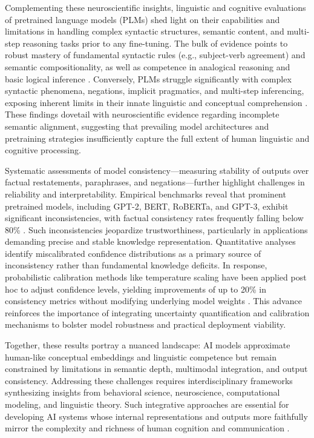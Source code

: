 \documentclass[sigconf]{acmart}
\begin{document}
Complementing these neuroscientific insights, linguistic and cognitive evaluations of pretrained language models (PLMs) shed light on their capabilities and limitations in handling complex syntactic structures, semantic content, and multi-step reasoning tasks prior to any fine-tuning. The bulk of evidence points to robust mastery of fundamental syntactic rules (e.g., subject-verb agreement) and semantic compositionality, as well as competence in analogical reasoning and basic logical inference \cite{ref34}. Conversely, PLMs struggle significantly with complex syntactic phenomena, negations, implicit pragmatics, and multi-step inferencing, exposing inherent limits in their innate linguistic and conceptual comprehension \cite{ref34}. These findings dovetail with neuroscientific evidence regarding incomplete semantic alignment, suggesting that prevailing model architectures and pretraining strategies insufficiently capture the full extent of human linguistic and cognitive processing.

Systematic assessments of model consistency—measuring stability of outputs over factual restatements, paraphrases, and negations—further highlight challenges in reliability and interpretability. Empirical benchmarks reveal that prominent pretrained models, including GPT-2, BERT, RoBERTa, and GPT-3, exhibit significant inconsistencies, with factual consistency rates frequently falling below 80\% \cite{ref35}. Such inconsistencies jeopardize trustworthiness, particularly in applications demanding precise and stable knowledge representation. Quantitative analyses identify miscalibrated confidence distributions as a primary source of inconsistency rather than fundamental knowledge deficits. In response, probabilistic calibration methods like temperature scaling have been applied post hoc to adjust confidence levels, yielding improvements of up to 20\% in consistency metrics without modifying underlying model weights \cite{ref35}. This advance reinforces the importance of integrating uncertainty quantification and calibration mechanisms to bolster model robustness and practical deployment viability.

Together, these results portray a nuanced landscape: AI models approximate human-like conceptual embeddings and linguistic competence but remain constrained by limitations in semantic depth, multimodal integration, and output consistency. Addressing these challenges requires interdisciplinary frameworks synthesizing insights from behavioral science, neuroscience, computational modeling, and linguistic theory. Such integrative approaches are essential for developing AI systems whose internal representations and outputs more faithfully mirror the complexity and richness of human cognition and communication \cite{ref2,ref4,ref5,ref34,ref35}.
\end{document}
